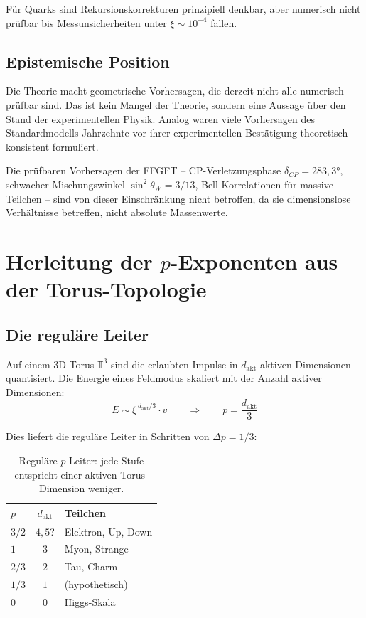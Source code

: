 Für Quarks sind Rekursionskorrekturen prinzipiell denkbar, aber
numerisch nicht prüfbar bis Messunsicherheiten unter $\xi \sim 10^{-4}$
fallen.

\subsection{Epistemische Position}

Die Theorie macht geometrische Vorhersagen, die derzeit nicht alle
numerisch prüfbar sind. Das ist kein Mangel der Theorie, sondern
eine Aussage über den Stand der experimentellen Physik. Analog
waren viele Vorhersagen des Standardmodells Jahrzehnte vor ihrer
experimentellen Bestätigung theoretisch konsistent formuliert.

Die prüfbaren Vorhersagen der FFGFT -- CP-Verletzungsphase
$\delta_{CP} = 283{,}3°$, schwacher Mischungswinkel $\sin^2\theta_W = 3/13$,
Bell-Korrelationen für massive Teilchen -- sind von dieser
Einschränkung nicht betroffen, da sie dimensionslose Verhältnisse
betreffen, nicht absolute Massenwerte.


\section{Herleitung der \texorpdfstring{$p$}{p}-Exponenten aus der Torus-Topologie}

\subsection{Die reguläre Leiter}

Auf einem 3D-Torus $\mathbb{T}^3$ sind die erlaubten Impulse in
$d_{\text{akt}}$ aktiven Dimensionen quantisiert. Die Energie eines
Feldmodus skaliert mit der Anzahl aktiver Dimensionen:
\begin{equation}
    E \sim \xi^{\,d_{\text{akt}}/3} \cdot v
    \qquad \Rightarrow \qquad
    p = \frac{d_{\text{akt}}}{3}
\end{equation}

Dies liefert die reguläre Leiter in Schritten von $\Delta p = 1/3$:

\begin{table}[htbp]
\centering
\begin{tabular}{lcl}
\toprule
$p$ & $d_{\text{akt}}$ & \textbf{Teilchen} \\
\midrule
$3/2$ & $4{,}5$? & Elektron, Up, Down \\
$1$   & $3$     & Myon, Strange \\
$2/3$ & $2$     & Tau, Charm \\
$1/3$ & $1$     & (hypothetisch) \\
$0$   & $0$     & Higgs-Skala \\
\bottomrule
\end{tabular}
\caption{Reguläre $p$-Leiter: jede Stufe entspricht einer aktiven
Torus-Dimension weniger.}
\label{tab:p_leiter}
\end{table}


